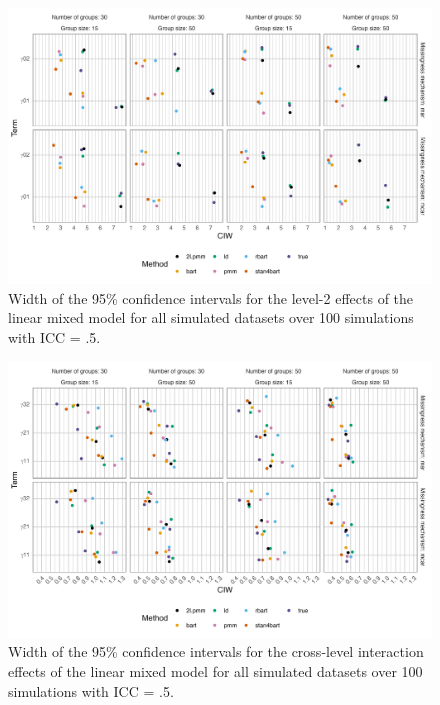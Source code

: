 \documentclass[10pt, a4paper, titlepage]{article}
\begin{document}
\begin{figure}[H]
    \centering
    \includegraphics[width=1\textwidth]{ciwlevel2.png}
    \caption{Width of the 95\% confidence intervals for the level-2 effects of the linear mixed model for all simulated datasets over 100 simulations with ICC = .5.}
    \label{fig:ciwlevel2}
\end{figure}

\begin{figure}[H]
    \centering
    \includegraphics[width=1\textwidth]{ciwcrosslevel.png}
    \caption{Width of the 95\% confidence intervals for the cross-level interaction effects of the linear mixed model for all simulated datasets over 100 simulations with ICC = .5.}
    \label{fig:ciwcrosslevel}
\end{figure}
\end{document}
